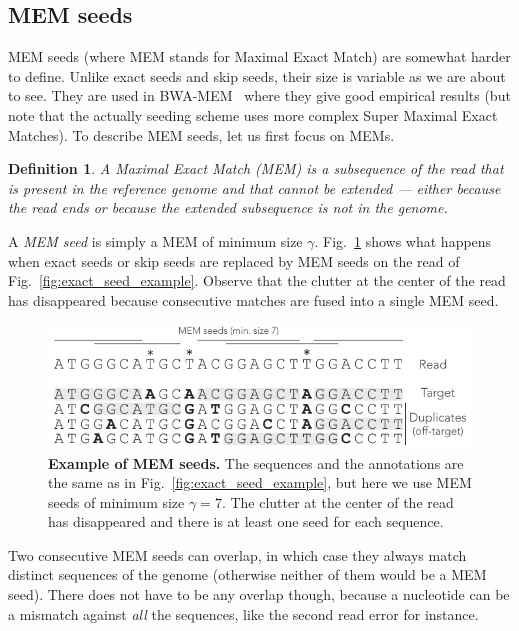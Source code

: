 \documentclass{article}
\newtheorem{definition}{Definition}
\begin{document}
\subsection{MEM seeds}

MEM seeds (where MEM stands for Maximal Exact Match) are somewhat harder
to define. Unlike exact seeds and skip seeds, their size is variable as we
are about to see. They are used in BWA-MEM~\cite{li2013aligning} where
they give good empirical results (but note that the actually seeding
scheme uses more complex Super Maximal Exact Matches). To describe MEM
seeds, let us first focus on MEMs.

\begin{definition}
A Maximal Exact Match (MEM) is a subsequence of the read that is present
in the reference genome and that cannot be extended --- either because the
read ends or because the extended subsequence is not in the genome.
\end{definition}

A \emph{MEM seed} is simply a MEM of minimum size $\gamma$.
Fig.~\ref{fig:MEM_example} shows what happens when exact seeds or skip
seeds are replaced by MEM seeds on the read of
Fig.~\ref{fig:exact_seed_example}. Observe that the clutter at the center
of the read has disappeared because consecutive matches are fused into a
single MEM seed.

\begin{figure}[h]
\centering
\includegraphics[scale=1]{MEM_example.pdf}
\caption{\textbf{Example of MEM seeds.}
The sequences and the annotations are the same as in
Fig.~\ref{fig:exact_seed_example}, but here we use MEM seeds of minimum
size $\gamma=7$. The clutter at the center of the read has disappeared and
there is at least one seed for each sequence.}
\label{fig:MEM_example}
\end{figure}

Two consecutive MEM seeds can overlap, in which case they always match
distinct sequences of the genome (otherwise neither of them would be a MEM
seed). There does not have to be any overlap though, because a nucleotide
can be a mismatch against \emph{all} the sequences, like the second read
error for instance.
\end{document}
